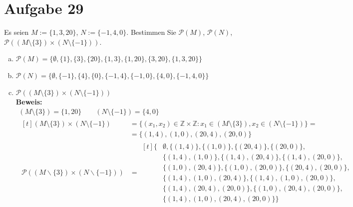 \documentclass[10pt, oneside]{article}
\begin{document}
\pagebreak
\section{Aufgabe 29}

Es seien $M := \{1, 3, 20\}$, $N := \{-1, 4, 0\}$. Bestimmen Sie
$\mathcal{P}(M)$, $\mathcal{P}(N)$, $\mathcal{P}((M \setminus \{3\}) \times (N
\setminus \{-1\}))$.

\begin{enumerate}[(a)]
    \item $\mathcal{P}(M) = \{\emptyset, \{1\}, \{3\}, \{20\}, \{1, 3\},
                              \{1, 20\}, \{3, 20\}, \{1, 3, 20\}\}$
    \item $\mathcal{P}(N) = \{\emptyset, \{-1\}, \{4\}, \{0\}, \{-1, 4\},
                              \{-1, 0\}, \{4, 0\}, \{-1, 4, 0\}\}$
    \item $\mathcal{P}((M \setminus \{3\}) \times (N \setminus \{-1\}))$ \\[5pt]
        \textbf{Beweis:}
        \begin{equation*}
            \begin{gathered}
                (M \setminus \{3\}) = \{1, 20\} \quad\quad (N \setminus \{-1\}) = \{4, 0\} \\[5pt]
                \begin{aligned}[t]
                    (M \setminus \{3\}) \times (N \setminus \{-1\}) &= \{(x_1,
                    x_2) \in \mathbb{Z} \times \mathbb{Z} : x_1 \in (M
                    \setminus \{3\}), x_2 \in (N \setminus \{-1\})\} = \\[5pt]
                    &= \{(1, 4), (1, 0), (20, 4), (20, 0)\} \\[5pt]
                    \mathcal{P}((M \backslash\{3\}) \times(N \backslash\{-1\})) &=
                    \begin{aligned}[t]
                        \{&\emptyset,\{(1,4)\},\{(1,0)\},\{(20,4)\},\{(20,0)\},\\
                          &\{(1,4),(1,0)\},\{(1,4),(20,4)\}, \{(1,4),(20,0)\}, \\
                          &\{(1,0),(20,4)\},\{(1,0),(20,0)\},\{(20,4),(20,0)\}, \\
                          &\{(1,4),(1,0),(20,4)\},\{(1,4),(1,0),(20,0)\}, \\
                          &\{(1,4),(20,4),(20,0)\},\{(1,0),(20,4),(20,0)\}, \\
                          &\{(1,4),(1,0),(20,4),(20,0)\}\}
                    \end{aligned}
                \end{aligned} \\[5pt]
            \end{gathered}
        \end{equation*}
\end{enumerate}
\end{document}
